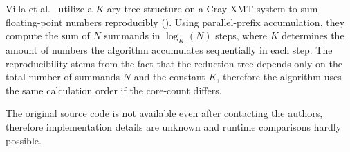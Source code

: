 Villa et al.~\cite{villa_effects_2009} utilize a $K$-ary tree structure on a Cray XMT system to sum floating-point numbers reproducibly ().
Using parallel-prefix accumulation, they compute the sum of $N$ summands in $\log_K (N)$ steps, where $K$ determines the amount of numbers the algorithm accumulates sequentially in each step.
The reproducibility stems from the fact that the reduction tree depends only on the total number of summands $N$ and the constant $K$, therefore the algorithm uses the same calculation order if the core-count differs.

The original source code is not available even after contacting the authors, therefore implementation details are unknown and runtime comparisons hardly possible.
